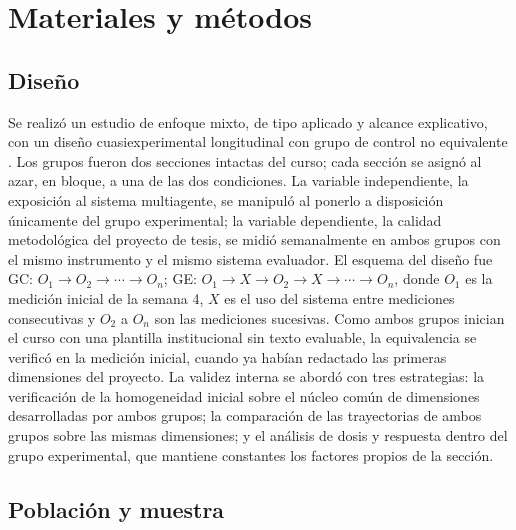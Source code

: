 \documentclass[journal]{IEEEtran}
\begin{document}
\section{Materiales y métodos}

\subsection{Diseño}

Se realizó un estudio de enfoque mixto, de tipo aplicado y alcance explicativo, con un diseño cuasiexperimental longitudinal con grupo de control no equivalente \cite{hernandez2018}. Los grupos fueron dos secciones intactas del curso; cada sección se asignó al azar, en bloque, a una de las dos condiciones. La variable independiente, la exposición al sistema multiagente, se manipuló al ponerlo a disposición únicamente del grupo experimental; la variable dependiente, la calidad metodológica del proyecto de tesis, se midió semanalmente en ambos grupos con el mismo instrumento y el mismo sistema evaluador. El esquema del diseño fue GC: $O_1 \rightarrow O_2 \rightarrow \cdots \rightarrow O_n$; GE: $O_1 \rightarrow X \rightarrow O_2 \rightarrow X \rightarrow \cdots \rightarrow O_n$, donde $O_1$ es la medición inicial de la semana 4, $X$ es el uso del sistema entre mediciones consecutivas y $O_2$ a $O_n$ son las mediciones sucesivas. Como ambos grupos inician el curso con una plantilla institucional sin texto evaluable, la equivalencia se verificó en la medición inicial, cuando ya habían redactado las primeras dimensiones del proyecto. La validez interna se abordó con tres estrategias: la verificación de la homogeneidad inicial sobre el núcleo común de dimensiones desarrolladas por ambos grupos; la comparación de las trayectorias de ambos grupos sobre las mismas dimensiones; y el análisis de dosis y respuesta dentro del grupo experimental, que mantiene constantes los factores propios de la sección.

\subsection{Población y muestra}
\end{document}

